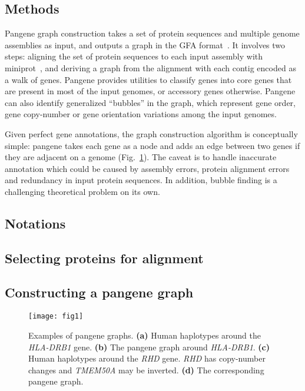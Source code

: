 \documentclass{bioinfo}
\begin{document}
\begin{methods}
\section*{Methods}

Pangene graph construction takes a set of protein sequences and multiple
genome assemblies as input, and outputs a graph in the GFA
format~\citep{Li:2020aa}. It involves two steps: aligning the set of protein
sequences to each input assembly with miniprot~\citep{Li:2023ac}, and deriving
a graph from the alignment with each contig encoded as a walk of genes.
Pangene provides utilities to classify genes into core genes that are present
in most of the input genomes, or accessory genes otherwise. Pangene can also
identify generalized ``bubbles'' in the graph, which represent gene order, gene
copy-number or gene orientation variations among the input genomes.

Given perfect gene annotations, the graph construction algorithm is
conceptually simple: pangene takes each gene as a node and adds an edge between
two genes if they are adjacent on a genome (Fig.~\ref{fig:ex1}). The caveat is
to handle inaccurate annotation which could be caused by assembly errors,
protein alignment errors and redundancy in input protein sequences. In
addition, bubble finding is a challenging theoretical problem on its own.

\subsection*{Notations}

\subsection*{Selecting proteins for alignment}

\subsection*{Constructing a pangene graph}

\begin{figure}
\centering
\texttt{[image: fig1]}
\caption{Examples of pangene graphs. {\bf (a)} Human haplotypes around the
\emph{HLA-DRB1} gene. {\bf (b)} The pangene graph around \emph{HLA-DRB1}. {\bf
(c)} Human haplotypes around the \emph{RHD} gene. \emph{RHD} has copy-number
changes and \emph{TMEM50A} may be inverted. {\bf (d)} The corresponding pangene
graph.}\label{fig:ex1}
\end{figure}


\end{methods}
\end{document}
